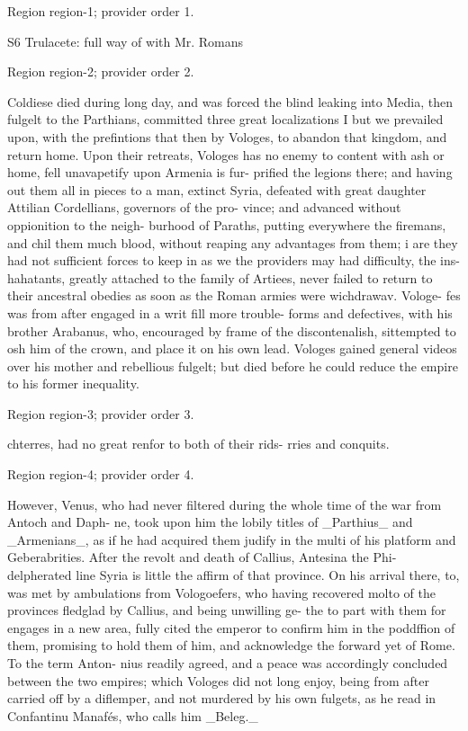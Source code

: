 \documentclass[11pt]{article}
\begin{document}
{\scriptsize\color{gray} Region region-1; provider order 1.\par}
\medskip

S6
Trulacete:
full way of
with Mr.
Romans
\par

{\scriptsize\color{gray} Region region-2; provider order 2.\par}
\medskip

Coldiese died during long day, and was forced the blind leaking into Media, then fulgelt to the Parthians, committed three great localizations I but we prevailed upon, with the prefintions that then by Vologes, to abandon that kingdom, and return home. Upon their retreats, Vologes has no enemy to content with ash or home, fell unavapetify upon Armenia is fur- prified the legions there; and having out them all in pieces to a man, extinct Syria, defeated with great daughter Attilian Cordellians, governors of the pro- vince; and advanced without oppionition to the neigh- burhood of Paraths, putting everywhere the firemans, and chil them much blood, without reaping any advantages from them; i are they had not sufficient forces to keep in as we the providers may had difficulty, the ins- hahatants, greatly attached to the family of Artiees, never failed to return to their ancestral obedies as soon as the Roman armies were wichdrawav. Vologe- fes was from after engaged in a writ fill more trouble- forms and defectives, with his brother Arabanus, who, encouraged by frame of the discontenalish, sittempted to osh him of the crown, and place it on his own lead. Vologes gained general videos over his mother and rebellious fulgelt; but died before he could reduce the empire to his former inequality.
\par

{\scriptsize\color{gray} Region region-3; provider order 3.\par}
\medskip

chterres, had no great renfor to both of their rids- rries and conquits.
\par

{\scriptsize\color{gray} Region region-4; provider order 4.\par}
\medskip

However, Venus, who had never filtered during the whole time of the war from Antoch and Daph- ne, took upon him the lobily titles of \_Parthius\_ and \_Armenians\_, as if he had acquired them judify in the multi of his platform and Geberabrities. After the revolt and death of Callius, Antesina the Phi- delpherated line Syria is little the affirm of that province. On his arrival there, to, was met by ambulations from Vologoefers, who having recovered molto of the provinces fledglad by Callius, and being unwilling ge- the to part with them for engages in a new area, fully cited the emperor to confirm him in the poddffion of them, promising to hold them of him, and acknowledge the forward yet of Rome. To the term Anton- nius readily agreed, and a peace was accordingly concluded between the two empires; which Vologes did not long enjoy, being from after carried off by a diflemper, and not murdered by his own fulgets, as he read in Confantinu Manafés, who calls him \_Beleg.\_
\par
\end{document}

